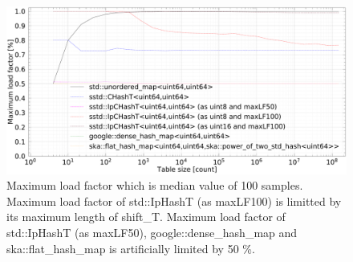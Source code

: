 




\begin{figure}[b]
  \includegraphics[scale=0.24]{./fig_bench/maxLoadFactor_med.pdf}
  \caption{
    Maximum load factor which is median value of 100 samples.
    Maximum load factor of std::IpHashT (as maxLF100) is limitted by its maximum length of shift\_T.
    Maximum load factor of std::IpHashT (as maxLF50), google::dense\_hash\_map and ska::flat\_hash\_map is artificially limited by 50 \%.
  }
  \label{fig_bench_LF}
\end{figure}


